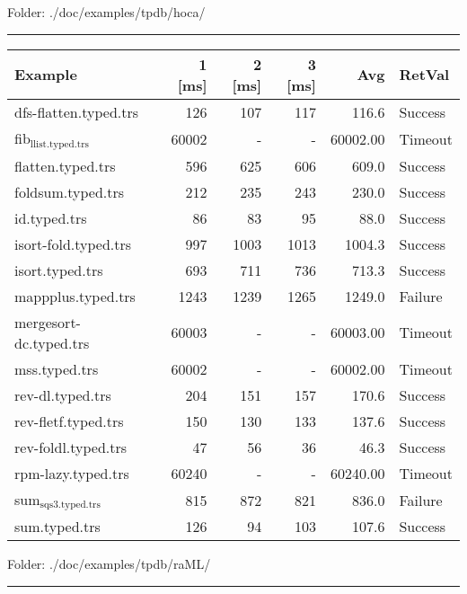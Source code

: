 \documentclass[11pt]{article}
\begin{document}
Folder: ./doc/examples/tpdb/hoca/

\rule{\linewidth}{0.5pt}

\begin{center}
\begin{tabular}{lrrrrl}
Example & 1 [ms] & 2 [ms] & 3 [ms] & Avg & RetVal\\
\hline
dfs-flatten.typed.trs & 126 & 107 & 117 & 116.6 & Success\\
fib\(_{\text{llist.typed.trs}}\) & 60002 & - & - & 60002.00 & Timeout\\
flatten.typed.trs & 596 & 625 & 606 & 609.0 & Success\\
foldsum.typed.trs & 212 & 235 & 243 & 230.0 & Success\\
id.typed.trs & 86 & 83 & 95 & 88.0 & Success\\
isort-fold.typed.trs & 997 & 1003 & 1013 & 1004.3 & Success\\
isort.typed.trs & 693 & 711 & 736 & 713.3 & Success\\
mappplus.typed.trs & 1243 & 1239 & 1265 & 1249.0 & Failure\\
mergesort-dc.typed.trs & 60003 & - & - & 60003.00 & Timeout\\
mss.typed.trs & 60002 & - & - & 60002.00 & Timeout\\
rev-dl.typed.trs & 204 & 151 & 157 & 170.6 & Success\\
rev-fletf.typed.trs & 150 & 130 & 133 & 137.6 & Success\\
rev-foldl.typed.trs & 47 & 56 & 36 & 46.3 & Success\\
rpm-lazy.typed.trs & 60240 & - & - & 60240.00 & Timeout\\
sum\(_{\text{sqs3.typed.trs}}\) & 815 & 872 & 821 & 836.0 & Failure\\
sum.typed.trs & 126 & 94 & 103 & 107.6 & Success\\
\end{tabular}

\end{center}


Folder: ./doc/examples/tpdb/raML/

\rule{\linewidth}{0.5pt}
\end{document}
